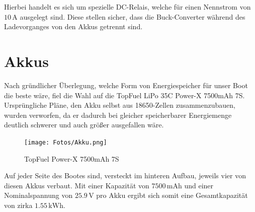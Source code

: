 Hierbei handelt es sich um spezielle DC-Relais, welche für einen Nennstrom von $10\,\mathrm{A}$ ausgelegt sind.
Diese stellen sicher, dass die Buck-Converter während des Ladevorganges von den Akkus getrennt sind.
\newpage
\section{Akkus \label{sec:Akkus}}
Nach gründlicher Überlegung, welche Form von Energiespeicher für unser Boot die beste wäre, fiel die Wahl auf die TopFuel LiPo 35C Power-X 7500mAh 7S.
Ursprüngliche Pläne, den Akku selbst aus 18650-Zellen zusammenzubauen, wurden verworfen, da er dadurch bei gleicher speicherbarer Energiemenge deutlich schwerer und auch größer ausgefallen wäre.
\begin{figure}[h]
    \centering
    \texttt{[image: Fotos/Akku.png]}
    \caption{TopFuel Power-X 7500mAh 7S}
\end{figure}

Auf jeder Seite des Bootes sind, versteckt im hinteren Aufbau, jeweils vier von diesen Akkus verbaut. Mit einer Kapazität von $7500\,\textrm{mAh}$ und einer Nominalspannung von $25.9\,\mathrm{V}$ pro Akku ergibt sich somit eine Gesamtkapazität von zirka $1.55\,\mathrm{kWh}$.

\newpage